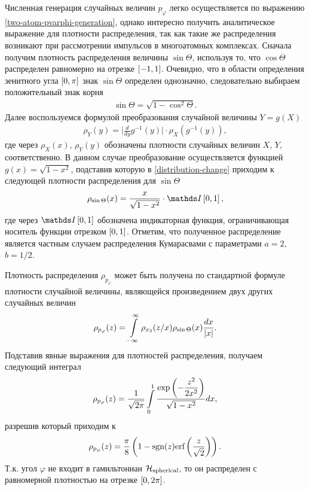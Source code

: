 Численная генерация случайных величин $p_\varphi$ легко осуществляется по выражению \eqref{two-atom-pvarphi-generation}, однако интересно получить аналитическое выражение для плотности распределения, так как такие же распределения возникают при рассмотрении импульсов в многоатомных комплексах. Сначала получим плотность распределения величины $\sin \Theta$, используя то, что $\cos \Theta$ распределен равномерно на отрезке $\left[ -1, 1\right]$. Очевидно, что в области определения зенитного угла $\left[ 0, \pi \right]$ знак $\sin \Theta$ определен однозначно, следовательно выбираем положительный знак корня 
\begin{gather}
    \sin \Theta = \sqrt{ 1 - \cos^2 \Theta}.
\end{gather}
Далее воспользуемся формулой преобразования случайной величины $Y = g(X)$
\begin{gather}
    \rho_Y(y) = \Big\vert \frac{d}{dy} g^{-1}(y) \Big\vert \cdot \rho_X(g^{-1}(y)), \label{distribution-change}
\end{gather}
%
где через $\rho_X(x)$, $\rho_Y(y)$ обозначены плотности случайных величин $X$, $Y$, соответственно. В данном случае преобразование осуществляется функцией $g(x) = \sqrt{1 - x^2}$, подставив которую в \eqref{distribution-change} приходим к следующей плотности распределения для $\sin \Theta$ 
\begin{gather}
    \rho_{\sin \Theta}(x) = \frac{x}{\sqrt{1 - x^2}} \cdot \bbI\lsq 0, 1\rsq,
\end{gather}
% 
где через $\bbI\lsq 0, 1 \rsq$ обозначена индикаторная функция, ограничивающая носитель функции отрезком $\left[ 0, 1 \right]$. Отметим, что полученное распределение является частным случаем распределения Кумарасвами с параметрами $a = 2$, $b = 1/2$. \par
Плотность распределения $\rho_{p_\varphi}$ может быть получена по стандартной формуле плотности случайной величины, являющейся произведением двух других случайных величин
\begin{gather}
    \rho_{p_\varphi}(z) = \int\limits_{-\infty}^\infty \rho_{x_3}(z/x) \rho_{\sin \Theta}(x) \frac{dx}{\vert x \vert}.
\end{gather}
Подставив явные выражения для плотностей распределения, получаем следующий интеграл
\begin{gather}
    \rho_{p_\varphi}(z) = \frac{1}{\sqrt{2 \pi}} \int\limits_0^1 \frac{\displaystyle \exp \left( -\frac{z^2}{2x^2} \right)}{\sqrt{1 - x^2}} dx,
\end{gather}
%
разрешив который приходим к
\begin{gather}
    \rho_{p_\varphi}(z) = \frac{\pi}{8} \left( 1 - \text{sgn}(z) \text{erf} \left( \frac{z}{\sqrt{2}} \right) \right).
\end{gather}
Т.к. угол $\varphi$ не входит в гамильтониан $\mathcal{H}_\text{spherical}$, то он распределен с равномерной плотностью на отрезке $\left[ 0, 2 \pi \right]$.

